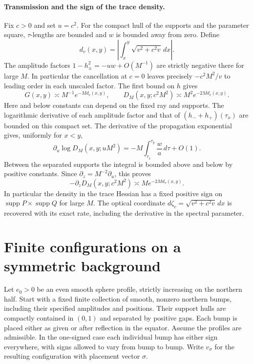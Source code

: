 \documentclass[11pt,letterpaper]{article}
\begin{document}
\paragraph{Transmission and the sign of the trace density.}
Fix \(c>0\) and set \(u=c^2\). For the compact hull of the supports and the
parameter square, \(\tau\)-lengths are bounded and \(w\) is bounded
away from zero. Define
\[
 d_v(x,y)=\left|\int_x^y\sqrt{v^2+c^2v}\,dx\right| .
\]
The amplitude factors \(1-h_\pm^2=-uw+O(M^{-1})\) are strictly
negative there for large \(M\). In particular the cancellation at
\(c=0\) leaves precisely \(-c^2 M^2/v\) to leading order in each
unscaled factor. The first bound on \(h\) gives
\[
 G(x,y)\asymp M^{-1}e^{-M d_v(x,y)},\qquad
 D_M(x,y;c^2M^2)\asymp M^2e^{-2M d_v(x,y)} .
\]
Here and below constants can depend on the fixed ray and supports.
The logarithmic derivative of each amplitude factor and that of
\((h_-+h_+)(\tau_x)\) are bounded on this compact set. The derivative
of the propagation exponential gives, uniformly for \(x<y\),
\[
 \partial_u\log D_M(x,y;uM^2)
   =-M\int_{\tau_x}^{\tau_y}\frac{w}{a}\,d\tau+O(1).
\]
Between the separated supports the integral is bounded above and below
by positive constants. Since \(\partial_z=M^{-2}\partial_u\), this proves
\[
 -\partial_zD_M(x,y;c^2M^2)\asymp
          M e^{-2M d_v(x,y)} .
\]
In particular the density in the trace Hessian has a fixed positive
sign on \(\operatorname{supp}P\times\operatorname{supp}Q\) for large \(M\).
The optical coordinate \(d\zeta_c=\sqrt{v^2+c^2v}\,dx\) is recovered
with its exact rate, including the derivative in the spectral parameter.

\section{Finite configurations on a symmetric background}

Let \(e_0>0\) be an even smooth sphere profile, strictly increasing
on the northern half. Start with a fixed finite collection of smooth,
nonzero northern bumps, including their specified amplitudes and
positions. Their support hulls are compactly contained in \((0,1)\)
and separated by positive gaps. Each bump is placed either as given
or after reflection in the equator. Assume the profiles are admissible.
In the one-signed case each individual bump has either sign everywhere,
with signs allowed to vary from bump to bump. Write \(v_\sigma\) for
the resulting configuration with placement vector \(\sigma\).
\end{document}
